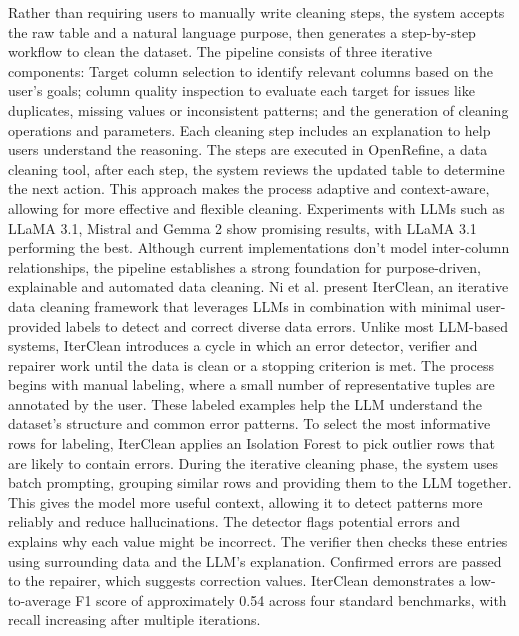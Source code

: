 Rather than requiring users to manually write cleaning steps, the system accepts the raw table and a natural language purpose, then generates a step-by-step workflow to clean the dataset.
The pipeline consists of three iterative components: Target column selection to identify relevant columns based on the user's goals; column quality inspection to evaluate each target for issues like duplicates, missing values or inconsistent patterns; and the generation of cleaning operations and parameters. 
Each cleaning step includes an explanation to help users understand the reasoning. 
The steps are executed in OpenRefine, a data cleaning tool, after each step, the system reviews the updated table to determine the next action. 
This approach makes the  process adaptive and context-aware, allowing for more effective and flexible cleaning. 
Experiments with LLMs such as LLaMA 3.1, Mistral and Gemma 2 show promising results, with LLaMA 3.1 performing the best. 
Although current implementations don't model inter-column relationships, the pipeline establishes a strong foundation for purpose-driven, explainable and automated data cleaning.
\newline\newline
Ni et al. \cite{ITERCLEAN} present IterClean, an iterative data cleaning framework that leverages LLMs in combination with minimal user-provided labels to detect and correct diverse data errors. 
Unlike most LLM-based systems, IterClean introduces a cycle in which an error detector, verifier and repairer work until the data is clean or a stopping criterion is met. 
The process begins with manual labeling, where a small number of representative tuples are annotated by the user. 
These labeled examples help the LLM understand the dataset's structure and common error patterns. 
To select the most informative rows for labeling, IterClean applies an Isolation Forest to pick outlier rows that are likely to contain errors. 
During the iterative cleaning phase, the system uses batch prompting, grouping similar rows and providing them to the LLM together. 
This gives the model more useful context, allowing it to detect patterns more reliably and reduce hallucinations. 
The detector flags potential errors and explains why each value might be incorrect. 
The verifier then checks these entries using surrounding data and the LLM's explanation. 
Confirmed errors are passed to the repairer, which suggests correction values. 
IterClean demonstrates a low-to-average F1 score of approximately 0.54 across four standard benchmarks, with recall increasing after multiple iterations. 

